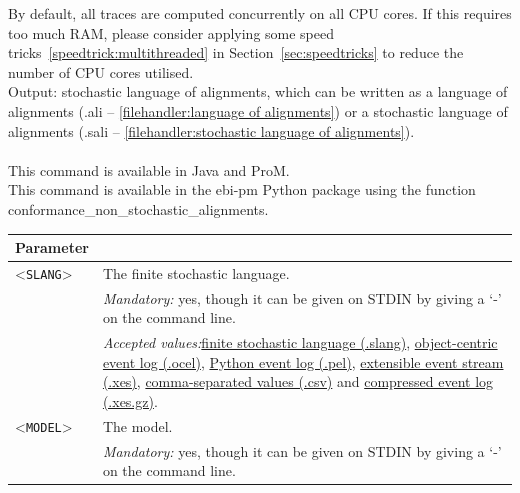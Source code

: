 {        By default, all traces are computed concurrently on all CPU cores. 
        If this requires too much RAM, please consider applying some speed tricks~\ref{speedtrick:multithreaded} in Section~\ref{sec:speedtricks} to reduce the number of CPU cores utilised.~\\
\noindent Output: stochastic language of alignments, which can be written as a language of alignments (.ali -- \cref{filehandler:language of alignments}) or a stochastic language of alignments (.sali -- \cref{filehandler:stochastic language of alignments}).\\
\\This command is available in Java and ProM.
\\This command is available in the ebi-pm Python package using the function conformance\_non\_stochastic\_alignments.
\begin{tabularx}{\linewidth}{lX}
\toprule
Parameter \\\midrule
<\texttt{SLANG}>&The finite stochastic language.\\
&\textit{Mandatory:} \quad yes, though it can be given on STDIN by giving a `-' on the command line.\\
&\textit{Accepted values:}\quad \hyperref[filehandler:finite stochastic language]{finite stochastic language (.slang)}, \hyperref[filehandler:object-centric event log]{object-centric event log (.ocel)}, \hyperref[filehandler:Python event log]{Python event log (.pel)}, \hyperref[filehandler:extensible event stream]{extensible event stream (.xes)}, \hyperref[filehandler:comma-separated values]{comma-separated values (.csv)} and \hyperref[filehandler:compressed event log]{compressed event log (.xes.gz)}.\\
<\texttt{MODEL}>&The model.\\
&\textit{Mandatory:} \quad yes, though it can be given on STDIN by giving a `-' on the command line.\\

\end{tabularx}}
